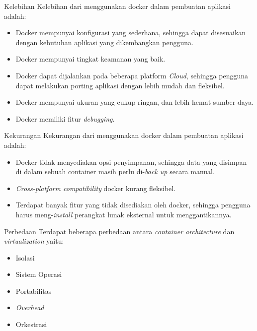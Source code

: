 \documentclass{beamer}
\begin{document}
	\begin{frame}{Kelebihan}
		Kelebihan dari menggunakan docker dalam pembuatan aplikasi adalah:
		\begin{itemize}
			\item Docker mempunyai konfigurasi yang sederhana, sehingga dapat disesuaikan dengan kebutuhan aplikasi yang dikembangkan pengguna.
			\item Docker mempunyai tingkat keamanan yang baik.
			\item Docker dapat dijalankan pada beberapa platform \textit{Cloud}, sehingga pengguna dapat melakukan porting aplikasi dengan lebih mudah dan fleksibel.
			\item Docker mempunyai ukuran yang cukup ringan, dan lebih hemat sumber daya.
			\item Docker memiliki fitur \textit{debugging}.
			
		\end{itemize}
	\end{frame}
	
	\begin{frame}{Kekurangan}
		Kekurangan dari menggunakan docker dalam pembuatan aplikasi adalah:
		\begin{itemize}
			\item Docker tidak menyediakan opsi penyimpanan, sehingga data yang disimpan di dalam sebuah container masih perlu di-\textit{back up} secara manual.
			\item \textit{Cross-platform compatibility} docker kurang fleksibel.
			\item Terdapat banyak fitur yang tidak disediakan oleh docker, sehingga pengguna harus meng-\textit{install} perangkat lunak eksternal untuk menggantikannya.
		\end{itemize}
	\end{frame}
	
	\begin{frame}{Perbedaan}
		Terdapat beberapa perbedaan antara \textit{container architecture} dan \textit{virtualization} yaitu:
		\begin{itemize}
			\item Isolasi
			\item Sistem Operasi
			\item Portabilitas
			\item \textit{Overhead}
			\item Orkestrasi
		\end{itemize}
	\end{frame}
\end{document}
